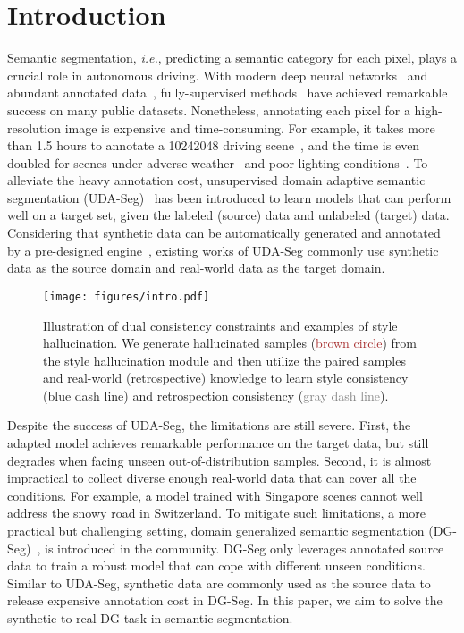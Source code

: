 \documentclass[runningheads]{llncs}
\def\ie{\emph{i.e.}} \def\Ie{\emph{I.e.}}
\begin{document}
\section{Introduction}
\begin{sloppypar}
Semantic segmentation, \ie, predicting a semantic category for each pixel, plays a crucial role in autonomous driving.
With modern deep neural networks~\cite{liu2021swin,liu2022convnet} and abundant annotated data~\cite{cityscapes,imagenet}, fully-supervised methods~\cite{deeplab,long2015fully,xie2021segformer} have achieved remarkable success on many public datasets. Nonetheless, annotating each pixel for a high-resolution image is expensive and time-consuming. For example, it takes more than 1.5 hours to annotate a 10242048 driving scene~\cite{cityscapes}, and the time is even doubled for scenes under adverse weather~\cite{acdc} and poor lighting conditions~\cite{darkzurich}. 
To alleviate the heavy annotation cost, unsupervised domain adaptive semantic segmentation (UDA-Seg)~\cite{adaptseg,zhou2021context,zhou2021domain} has been introduced to learn models that can perform well on a target set, given the labeled (source) data and unlabeled (target) data. 
Considering that synthetic data can be automatically generated and annotated by a pre-designed engine~\cite{gtav,synthia}, existing works of UDA-Seg commonly use synthetic data as the source domain and real-world data as the target domain.
\end{sloppypar}

\begin{figure}[t]
    \centering
    \texttt{[image: figures/intro.pdf]}
    \caption{Illustration of dual consistency constraints and examples of style hallucination. We generate hallucinated samples (\textcolor{brown}{brown circle}) from the style hallucination module and then utilize the paired samples and real-world (retrospective) knowledge to learn style consistency (\textcolor{dark-blue}{blue dash line}) and retrospection consistency (\textcolor{gray}{gray dash line}).}
    \label{fig:intro}
\end{figure}

Despite the success of UDA-Seg, the limitations are still severe. First, the adapted model achieves remarkable performance on the target data, but  
still degrades when facing unseen out-of-distribution samples. Second, it is almost impractical to collect diverse enough real-world data that can cover all the conditions. 
For example, a model trained with Singapore scenes cannot well address the snowy road in Switzerland. 
To mitigate such limitations, a more practical but challenging setting, domain generalized semantic segmentation (DG-Seg)~\cite{robustnet,DRPC,zhong2022adversarial}, is introduced in the community. 
DG-Seg only leverages annotated source data to train a robust model that can cope with different unseen conditions. Similar to UDA-Seg, synthetic data are commonly used as the source data to release expensive annotation cost in DG-Seg. In this paper, we aim to solve the synthetic-to-real DG task in semantic segmentation.
\end{document}
